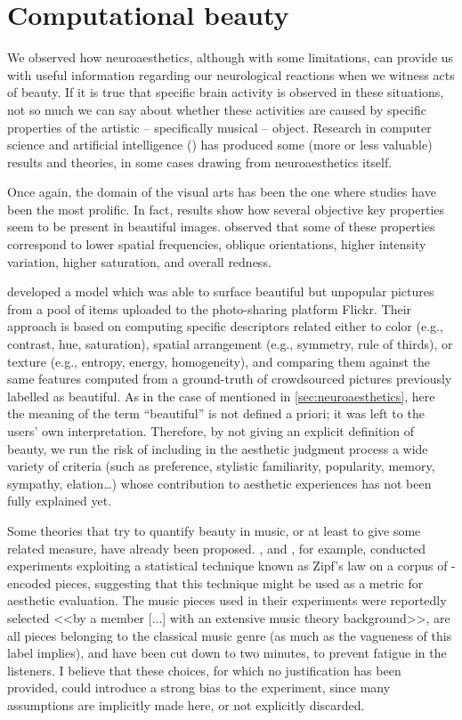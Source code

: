 \section{Computational beauty}\label{sec:comp-beauty}
We observed how neuroaesthetics, although with some limitations, can provide us with useful information regarding our neurological reactions when we witness acts of beauty. If it is true that specific brain activity is observed in these situations, not so much we can say about whether these activities are caused by specific properties of the artistic -- specifically musical -- object. Research in computer science and artificial intelligence () has produced some (more or less valuable) results and theories, in some cases drawing from neuroaesthetics itself.

Once again, the domain of the visual arts has been the one where studies have been the most prolific. In fact, results show how several objective key properties seem to be present in beautiful images. \cite{jacobs2016aesthetics} observed that some of these properties correspond to lower spatial frequencies, oblique orientations, higher intensity variation, higher saturation, and overall redness.

\cite{schifanella2015image} developed a model which was able to surface beautiful but unpopular pictures from a pool of items uploaded to the photo-sharing platform Flickr. Their approach is based on computing specific descriptors related either to color (e.g., contrast, hue, saturation), spatial arrangement (e.g., symmetry, rule of thirds), or texture (e.g., entropy, energy, homogeneity), and comparing them against the same features computed from a ground-truth of crowdsourced pictures previously labelled as beautiful. As in the case of \cite{kawabata2004neural} mentioned in \autoref{sec:neuroaesthetics}, here the meaning of the term ``beautiful'' is not defined a priori; it was left to the users' own interpretation. Therefore, by not giving an explicit definition of beauty, we run the risk of including in the aesthetic judgment process a wide variety of criteria (such as preference, stylistic familiarity, popularity, memory, sympathy, elation\ldots) whose contribution to aesthetic experiences has not been fully explained yet.

Some theories that try to quantify beauty in music, or at least to give some related measure, have already been proposed. \cite{manaris2002progress}, and \cite{manaris2005zipf}, for example, conducted experiments exploiting a statistical technique known as Zipf’s law on a corpus of -encoded pieces, suggesting that this technique might be used as a metric for aesthetic evaluation. The music pieces used in their experiments were reportedly selected <<by a member [...] with an extensive music theory background>>, are all pieces belonging to the classical music genre (as much as the vagueness of this label implies), and have been cut down to two minutes, to prevent fatigue in the listeners. I believe that these choices, for which no justification has been provided, could introduce a strong bias to the experiment, since many assumptions are implicitly made here, or not explicitly discarded.

